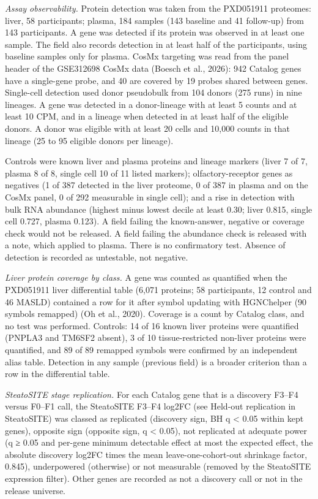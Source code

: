 \emph{Assay observability.} Protein detection was taken from the PXD051911 proteomes: liver, 58 participants; plasma, 184 samples (143 baseline and 41 follow-up) from 143 participants. A gene was detected if its protein was observed in at least one sample. The field also records detection in at least half of the participants, using baseline samples only for plasma. CosMx targeting was read from the panel header of the GSE312698 CosMx data (Boesch et al., 2026): 942 Catalog genes have a single-gene probe, and 40 are covered by 19 probes shared between genes. Single-cell detection used donor pseudobulk from 104 donors (275 runs) in nine lineages. A gene was detected in a donor-lineage with at least 5 counts and at least 10 CPM, and in a lineage when detected in at least half of the eligible donors. A donor was eligible with at least 20 cells and 10,000 counts in that lineage (25 to 95 eligible donors per lineage).

Controls were known liver and plasma proteins and lineage markers (liver 7 of 7, plasma 8 of 8, single cell 10 of 11 listed markers); olfactory-receptor genes as negatives (1 of 387 detected in the liver proteome, 0 of 387 in plasma and on the CosMx panel, 0 of 292 measurable in single cell); and a rise in detection with bulk RNA abundance (highest minus lowest decile at least 0.30; liver 0.815, single cell 0.727, plasma 0.123). A field failing the known-answer, negative or coverage check would not be released. A field failing the abundance check is released with a note, which applied to plasma. There is no confirmatory test. Absence of detection is recorded as untestable, not negative.

\emph{Liver protein coverage by class.} A gene was counted as quantified when the PXD051911 liver differential table (6,071 proteins; 58 participants, 12 control and 46 MASLD) contained a row for it after symbol updating with HGNChelper (90 symbols remapped) (Oh et al., 2020). Coverage is a count by Catalog class, and no test was performed. Controls: 14 of 16 known liver proteins were quantified (PNPLA3 and TM6SF2 absent), 3 of 10 tissue-restricted non-liver proteins were quantified, and 89 of 89 remapped symbols were confirmed by an independent alias table. Detection in any sample (previous field) is a broader criterion than a row in the differential table.

\emph{SteatoSITE stage replication.} For each Catalog gene that is a discovery F3--F4 versus F0--F1 call, the SteatoSITE F3--F4 log2FC (see Held-out replication in SteatoSITE) was classed as replicated (discovery sign, BH q \textless{} 0.05 within kept genes), opposite sign (opposite sign, q \textless{} 0.05), not replicated at adequate power (q ≥ 0.05 and per-gene minimum detectable effect at most the expected effect, the absolute discovery log2FC times the mean leave-one-cohort-out shrinkage factor, 0.845), underpowered (otherwise) or not measurable (removed by the SteatoSITE expression filter). Other genes are recorded as not a discovery call or not in the release universe.

